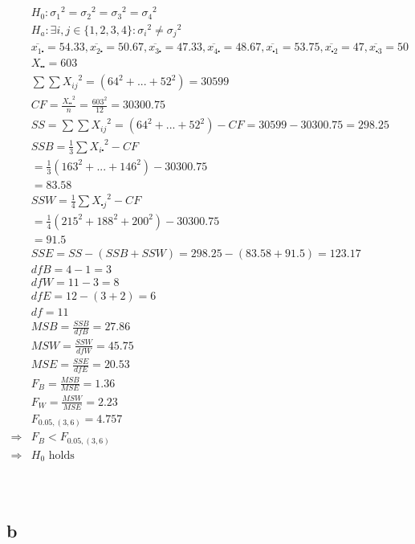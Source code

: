 \documentclass{article}
\begin{document}
\begin{align*}
    &H_0:{\sigma_1}^2={\sigma_2}^2={\sigma_3}^2={\sigma_4}^2\\
    &H_a:\exists i,j\in\{1,2,3,4\}:{\sigma_i}^2\ne{\sigma_j}^2\\
    &\overline{x_{1\centerdot}}=54.33,\overline{x_{2\centerdot}}=50.67,\overline{x_{3\centerdot}}=47.33,\overline{x_{4\centerdot}}=48.67,\overline{x_{\centerdot1}}=53.75,\overline{x_{\centerdot2}}=47,\overline{x_{\centerdot3}}=50\\
    &X_{\centerdot\centerdot}=603\\
    &\sum\sum{X_{ij}}^2=(64^2+...+52^2)=30599\\
    &CF=\frac{{X_{\centerdot\centerdot}}^2}{n}=\frac{603^2}{12}=30300.75\\
    &SS=\sum\sum{X_{ij}}^2=(64^2+...+52^2)-CF=30599-30300.75=298.25\\
    &SSB=\frac{1}{3}\sum{X_{i\centerdot}}^2-CF\\
    &=\frac{1}{3}(163^2+...+146^2)-30300.75\\
    &=83.58\\
    &SSW=\frac{1}{4}\sum{X_{\centerdot j}}^2-CF\\
    &=\frac{1}{4}(215^2+188^2+200^2)-30300.75\\
    &=91.5\\
    &SSE=SS-(SSB+SSW)=298.25-(83.58+91.5)=123.17\\
    &dfB=4-1=3\\
    &dfW=11-3=8\\
    &dfE=12-(3+2)=6\\
    &df=11\\
    &MSB=\frac{SSB}{dfB}=27.86\\
    &MSW=\frac{SSW}{dfW}=45.75\\
    &MSE=\frac{SSE}{dfE}=20.53\\
    &F_B=\frac{MSB}{MSE}=1.36\\
    &F_W=\frac{MSW}{MSE}=2.23\\
    &F_{0.05,(3,6)}=4.757\\
    \Rightarrow&F_B<F_{0.05,(3,6)}\\
    \Rightarrow&H_0\text{ holds}\\
\end{align*}

~

\subsection*{b}
\end{document}
